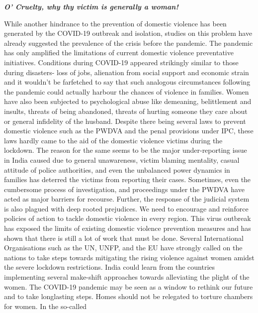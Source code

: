 \begin{multicols}{2}
\begin{enumerate}
\end{enumerate}

\vspace{-.3cm}


\noi
{\large\it\bfseries O’ Cruelty, why thy victim is generally a woman!}

\noi
While another hindrance to the prevention of domestic violence has been generated by the
COVID-19 outbreak and isolation, studies on this problem have already suggested the
prevalence of the crisis before the pandemic. The pandemic has only amplified the limitations
of current domestic violence preventative initiatives. Conditions during COVID-19 appeared
strikingly similar to those during disasters- loss of jobs, alienation from social support and
economic strain and it wouldn’t be farfetched to say that such analogous circumstances
following the pandemic could actually harbour the chances of violence in families. Women have also been subjected to psychological abuse like demeaning, belittlement and insults,
threats of being abandoned, threats of hurting someone they care about or general infidelity
of the husband. Despite there being several laws to prevent domestic violence such as the
PWDVA and the penal provisions under IPC, these laws hardly came to the aid of the
domestic violence victims during the lockdown. The reason for the same seems to be the
major under-reporting issue in India caused due to general unawareness, victim blaming
mentality, casual attitude of police authorities, and even the unbalanced power dynamics in
families has deterred the victims from reporting their cases. Sometimes, even the
cumbersome process of investigation, and proceedings under the PWDVA have acted as
major barriers for recourse. Further, the response of the judicial system is also plagued with
deep rooted prejudices. We need to encourage and reinforce policies of action to tackle
domestic violence in every region. This virus outbreak has exposed the limits of existing
domestic violence prevention measures and has shown that there is still a lot of work that
must be done. Several International Organisations such as the UN, UNFP, and the EU have
strongly called on the nations to take steps towards mitigating the rising violence against
women amidst the severe lockdown restrictions. India could learn from the countries
implementing several make-shift approaches towards alleviating the plight of the women.
The COVID-19 pandemic may be seen as a window to rethink our future and to take longlasting steps. Homes should not be relegated to torture chambers for women. In the so-called

\end{multicols}
